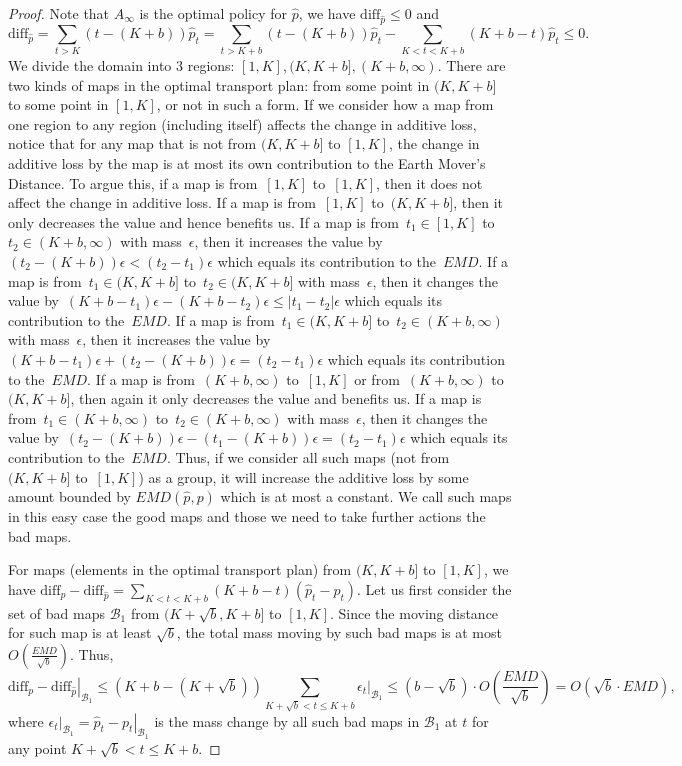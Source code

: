 \begin{proof}
    Note that $A_\infty$ is the optimal policy for $\hat{p}$, we have $\text{diff}_{\hat{p}} \leq 0$ and 
    \[\text{diff}_{\hat{p}} = \sum_{t>K}(t-(K+b))\hat{p}_t = \sum_{t>K+b}(t-(K+b))\hat{p}_t - \sum_{K<t<K+b}(K+b-t)\hat{p}_t \leq 0.\]
    We divide the domain into 3 regions: $[1,K], (K,K+b], (K+b,\infty)$. There are two kinds of maps in the optimal transport plan: from some point in $(K,K+b]$ to some point in $[1,K]$, or not in such a form. If we consider how a map from one region to any region (including itself) affects the change in additive loss, notice that for any map that is not from $(K,K+b]$ to $[1,K]$, the change in additive loss by the map is at most its own contribution to the Earth Mover's Distance.
    To argue this, if a map is from~$[1,K]$ to~$[1,K]$, then it does not affect the change in additive loss. If a map is from~$[1,K]$ to~$(K,K+b]$, then it only decreases the value and hence benefits us. If a map is from~$t_1 \in [1,K]$ to~$t_2 \in (K+b,\infty)$ with mass~$\epsilon$, then it increases the value by~$(t_2 - (K+b))\epsilon < (t_2-t_1)\epsilon$ which equals its contribution to the~$EMD$. If a map is from~$t_1 \in (K,K+b]$ to~$t_2 \in (K,K+b]$ with mass~$\epsilon$, then it changes the value by~$(K+b-t_1)\epsilon - (K+b-t_2)\epsilon \leq |t_1-t_2|\epsilon$ which equals its contribution to the~$EMD$. If a map is from~$t_1 \in (K,K+b]$ to~$t_2 \in (K+b,\infty)$ with mass~$\epsilon$, then it increases the value by~$(K+b-t_1)\epsilon + (t_2 - (K+b))\epsilon = (t_2-t_1)\epsilon$ which equals its contribution to the~$EMD$. If a map is from~$(K+b,\infty)$ to~$[1,K]$ or from~$(K+b,\infty)$ to~$(K,K+b]$, then again it only decreases the value and benefits us. If a map is from~$t_1 \in (K+b,\infty)$ to~$t_2 \in (K+b,\infty)$ with mass~$\epsilon$, then it changes the value by~$(t_2-(K+b))\epsilon - (t_1-(K+b))\epsilon = (t_2-t_1)\epsilon$ which equals its contribution to the~$EMD$.
    Thus, if we consider all such maps (not from~$(K,K+b]$ to~$[1,K]$) as a group, it will increase the additive loss by some amount bounded by $EMD(\hat{p},p)$ which is at most a constant. We call such maps in this easy case the good maps and those we need to take further actions the bad maps.

    For maps (elements in the optimal transport plan) from $(K,K+b]$ to $[1,K]$, we have $\text{diff}_p - \text{diff}_{\hat{p}} = \sum_{K<t<K+b}(K+b-t)(\hat{p}_t - p_t)$. Let us first consider the set of bad maps $\mathcal{B}_1$ from $(K+\sqrt{b},K+b]$ to $[1,K]$. Since the moving distance for such map is at least $\sqrt{b}$, the total mass moving by such bad maps is at most $O(\frac{EMD}{\sqrt{b}})$. Thus, 
    $$\left. \text{diff}_p - \text{diff}_{\hat{p}} \right|_{\mathcal{B}_1} \leq (K+b-(K+\sqrt{b}))\sum_{K+\sqrt{b}<t\leq K+b}\left. \epsilon_t \right|_{\mathcal{B}_1} \leq (b-\sqrt{b})\cdot O(\frac{EMD}{\sqrt{b}})=O(\sqrt{b}\cdot EMD),$$
    where $\left. \epsilon_t \right|_{\mathcal{B}_1} = \left. \hat{p}_t - p_t \right|_{\mathcal{B}_1}$ is the mass change by all such bad maps in $\mathcal{B}_1$ at $t$ for any point $K+\sqrt{b}<t \leq K+b$.


\end{proof}
